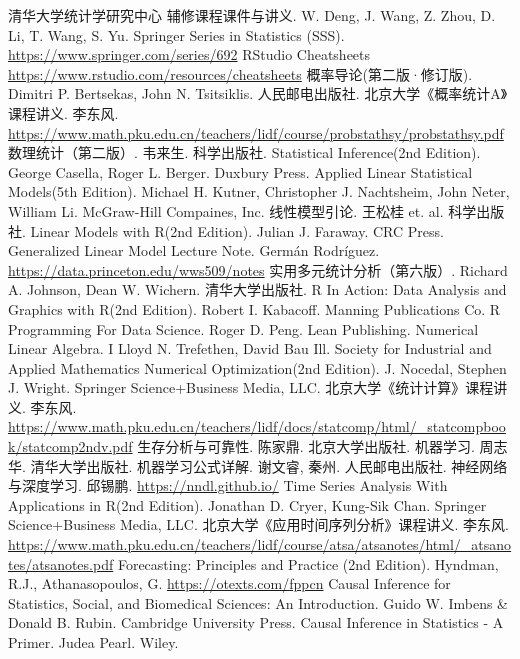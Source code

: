 \begin{thebibliography}{99}
    清华大学统计学研究中心 辅修课程课件与讲义. W. Deng, J. Wang, Z. Zhou, D. Li, T. Wang, S. Yu.
    Springer Series in Statistics (SSS). \url{https://www.springer.com/series/692}
    RStudio Cheatsheets \url{https://www.rstudio.com/resources/cheatsheets}
    概率导论(第二版·修订版). Dimitri P. Bertsekas, John N. Tsitsiklis. 人民邮电出版社.
    北京大学《概率统计A》课程讲义. 李东风. \url{https://www.math.pku.edu.cn/teachers/lidf/course/probstathsy/probstathsy.pdf}
    数理统计（第二版）. 韦来生. 科学出版社.
    Statistical Inference(2nd Edition). George Casella, Roger L. Berger. Duxbury Press.
    Applied Linear Statistical Models(5th Edition). Michael H. Kutner, Christopher J. Nachtsheim, John Neter, William Li. McGraw-Hill Compaines, Inc.
    线性模型引论. 王松桂 et. al. 科学出版社.
    Linear Models with R(2nd Edition). Julian J. Faraway. CRC Press.
    Generalized Linear Model Lecture Note. Germán Rodríguez. \url{https://data.princeton.edu/wws509/notes}
    实用多元统计分析（第六版）. Richard A. Johnson, Dean W. Wichern. 清华大学出版社.
    R In Action: Data Analysis and Graphics with R(2nd Edition). Robert I. Kabacoff. Manning Publications Co.
    R Programming For Data Science. Roger D. Peng. Lean Publishing.
    Numerical Linear Algebra. I Lloyd N. Trefethen, David Bau Ill. Society for Industrial and Applied Mathematics
    Numerical Optimization(2nd Edition). J. Nocedal, Stephen J. Wright. Springer Science+Business Media, LLC. 
    北京大学《统计计算》课程讲义. 李东风. \url{https://www.math.pku.edu.cn/teachers/lidf/docs/statcomp/html/_statcompbook/statcomp2ndv.pdf}
    生存分析与可靠性. 陈家鼎. 北京大学出版社.
    机器学习. 周志华. 清华大学出版社.
    机器学习公式详解. 谢文睿, 秦州. 人民邮电出版社.
    神经网络与深度学习. 邱锡鹏. \url{https://nndl.github.io/}
    Time Series Analysis With Applications in R(2nd Edition). Jonathan D. Cryer, Kung-Sik Chan. Springer Science+Business Media, LLC.
    北京大学《应用时间序列分析》课程讲义. 李东风. \url{https://www.math.pku.edu.cn/teachers/lidf/course/atsa/atsanotes/html/_atsanotes/atsanotes.pdf}
    Forecasting: Principles and Practice (2nd Edition). Hyndman, R.J., Athanasopoulos, G. \url{https://otexts.com/fppcn}
    Causal Inference for Statistics, Social, and Biomedical Sciences: An Introduction. Guido W. Imbens \& Donald B. Rubin. Cambridge University Press.
    Causal Inference in Statistics - A Primer. Judea Pearl. Wiley.



\end{thebibliography}